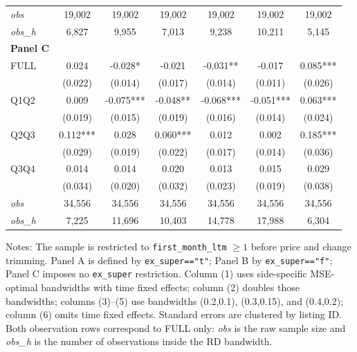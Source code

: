 \begin{table}[!htbp]
\begin{tabular}{lcccccc}
\textit{obs} & 19,002 & 19,002 & 19,002 & 19,002 & 19,002 & 19,002 \\
\textit{obs\_h} &  6,827 &  9,955 &  7,013 &  9,238 & 10,211 &  5,145 \\

\textbf{Panel C} &&&&&&  \\

FULL & 0.024 & -0.028* & -0.021 & -0.031** & -0.017 & 0.085*** \\
 & (0.022) & (0.014) & (0.017) & (0.014) & (0.011) & (0.026) \\
Q1Q2 & 0.009 & -0.075*** & -0.048** & -0.068*** & -0.051*** & 0.063*** \\
 & (0.019) & (0.015) & (0.019) & (0.016) & (0.014) & (0.024) \\
Q2Q3 & 0.112*** & 0.028 & 0.060*** & 0.012 & 0.002 & 0.185*** \\
 & (0.029) & (0.019) & (0.022) & (0.017) & (0.014) & (0.036) \\
Q3Q4 & 0.014 & 0.014 & 0.020 & 0.013 & 0.015 & 0.029 \\
 & (0.034) & (0.020) & (0.032) & (0.023) & (0.019) & (0.038) \\

\textit{obs} & 34,556 & 34,556 & 34,556 & 34,556 & 34,556 & 34,556 \\
\textit{obs\_h} &  7,225 & 11,696 & 10,403 & 14,778 & 17,988 &  6,304 \\

\bottomrule
\end{tabular}
\begin{minipage}{0.98\textwidth}\footnotesize
Notes: The sample is restricted to \texttt{first\_month\_ltm} $\geq 1$ before price and change trimming. Panel A is defined by \texttt{ex\_super=="t"}; Panel B by \texttt{ex\_super=="f"}; Panel C imposes no \texttt{ex\_super} restriction. Column (1) uses side-specific MSE-optimal bandwidths with time fixed effects; column (2) doubles those bandwidths; columns (3)--(5) use bandwidths (0.2,0.1), (0.3,0.15), and (0.4,0.2); column (6) omits time fixed effects. Standard errors are clustered by listing ID. Both observation rows correspond to FULL only: \textit{obs} is the raw sample size and \textit{obs\_h} is the number of observations inside the RD bandwidth.
\end{minipage}
\end{table}
\clearpage

